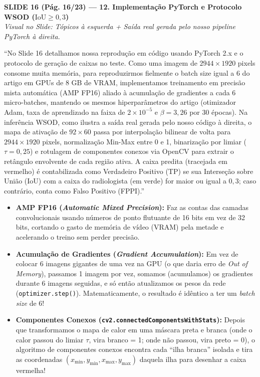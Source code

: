 \documentclass[11pt,a4paper]{article}
\newcommand{\slideheader}[3]{%
    \vspace{10pt}%
    \begin{tcolorbox}[colback=slateborder, colframe=slateborder, coltext=white, boxrule=0pt, arc=3pt, left=8pt, right=8pt, top=5pt, bottom=5pt]
        {\large\bfseries #1 — #2}\\[2pt]
        {\small\itshape Visual no Slide: #3}
    \end{tcolorbox}%
}
\newenvironment{falabox}{%
    \begin{tcolorbox}[colback=speechbg, colframe=speechborder, boxrule=1.2pt, arc=4pt, left=10pt, right=10pt, top=8pt, bottom=8pt, title={\bfseries O QUE VOCÊ DEVE FALAR (Fala Sugerida)}]%
}{%
    \end{tcolorbox}%
}
\newenvironment{explicabox}{%
    \begin{tcolorbox}[colback=explainbg, colframe=explainborder, boxrule=0.8pt, arc=4pt, left=10pt, right=10pt, top=8pt, bottom=8pt, title={\bfseries ENTENDA O QUE VOCÊ ESTÁ FALANDO (Explicação Didática de Cada Termo)}]%
}{%
    \end{tcolorbox}%
}
\begin{document}
\newpage
\slideheader{SLIDE 16 (Pág. 16/23)}{12. Implementação PyTorch e Protocolo WSOD ($\text{IoU} \ge 0{,}3$)}{Tópicos à esquerda + Saída real gerada pelo nosso pipeline PyTorch à direita.}

\begin{falabox}
``No Slide 16 detalhamos nossa reprodução em código usando PyTorch 2.x e o protocolo de geração de caixas no teste. Como uma imagem de $2944 \times 1920$ pixels consome muita memória, para reproduzirmos fielmente o batch size igual a 6 do artigo em GPUs de 8 GB de VRAM, implementamos treinamento em precisão mista automática (AMP FP16) aliado à acumulação de gradientes a cada 6 micro-batches, mantendo os mesmos hiperparâmetros do artigo (otimizador Adam, taxa de aprendizado na faixa de $2 \times 10^{-5}$ e $\beta = 3{,}26$ por 30 épocas).
Na inferência WSOD, como ilustra a saída real gerada pelo nosso código à direita, o mapa de ativação de $92 \times 60$ passa por interpolação bilinear de volta para $2944 \times 1920$ pixels, normalização Min-Max entre 0 e 1, binarização por limiar ($\tau = 0{,}25$) e rotulagem de componentes conexos via OpenCV para extrair o retângulo envolvente de cada região ativa. A caixa predita (tracejada em vermelho) é contabilizada como Verdadeiro Positivo (TP) se sua Interseção sobre União (IoU) com a caixa do radiologista (em verde) for maior ou igual a $0{,}3$; caso contrário, conta como Falso Positivo (FPPI).''
\end{falabox}

\begin{explicabox}
\begin{itemize}[leftmargin=*, itemsep=4pt]
    \item \textbf{AMP FP16 (\textit{Automatic Mixed Precision}):} Faz as contas das camadas convolucionais usando números de ponto flutuante de 16 bits em vez de 32 bits, cortando o gasto de memória de vídeo (VRAM) pela metade e acelerando o treino sem perder precisão.
    \item \textbf{Acumulação de Gradientes (\textit{Gradient Accumulation}):} Em vez de colocar 6 imagens gigantes de uma vez na GPU (o que daria erro de \textit{Out of Memory}), passamos 1 imagem por vez, somamos (acumulamos) os gradientes durante 6 imagens seguidas, e só então atualizamos os pesos da rede (\texttt{optimizer.step()}). Matematicamente, o resultado é idêntico a ter um \textit{batch size} de 6!
    \item \textbf{Componentes Conexos (\texttt{cv2.connectedComponentsWithStats}):} Depois que transformamos o mapa de calor em uma máscara preta e branca (onde o calor passou do limiar $\tau$, vira branco = 1; onde não passou, vira preto = 0), o algoritmo de componentes conexos encontra cada ``ilha branca'' isolada e tira as coordenadas $(x_{\min}, y_{\min}, x_{\max}, y_{\max})$ daquela ilha para desenhar a caixa vermelha!
\end{itemize}
\end{explicabox}
\end{document}
